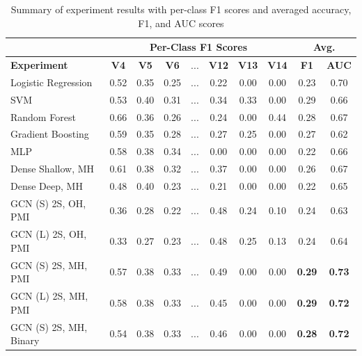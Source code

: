 \documentclass{article}
\begin{document}
\begin{table}[h!]
\centering
\caption{Summary of experiment results with per-class F1 scores and averaged accuracy, F1, and AUC scores}
\label{tab:my-table}
\begin{tabular}{@{}lccclccccc@{}}
\toprule
                            & \multicolumn{7}{c}{\textbf{Per-Class F1 Scores}} & \multicolumn{2}{c}{\textbf{Avg.}} \\ \midrule
\textbf{Experiment} & \textbf{V4} & \textbf{V5} & \textbf{V6} & ... & \textbf{V12} & \textbf{V13} & \textbf{V14} & \textbf{F1} & \textbf{AUC} \\
Logistic Regression         & 0.52  & 0.35  & 0.25  & ... & 0.22 & 0.00 & 0.00 & 0.23            & 0.70            \\
SVM                         & 0.53  & 0.40  & 0.31  & ... & 0.34 & 0.33 & 0.00 & 0.29            & 0.66            \\
Random Forest               & 0.66  & 0.36  & 0.26  & ... & 0.24 & 0.00 & 0.44 & 0.28            & 0.67            \\
Gradient Boosting           & 0.59  & 0.35  & 0.28  & ... & 0.27 & 0.25 & 0.00 & 0.27            & 0.62            \\
MLP                         & 0.58  & 0.38  & 0.34  & ... & 0.00 & 0.00 & 0.00 & 0.22            & 0.66            \\
Dense Shallow, MH           & 0.61  & 0.38  & 0.32  & ... & 0.37 & 0.00 & 0.00 & 0.26            & 0.67            \\
Dense Deep, MH              & 0.48  & 0.40  & 0.23  & ... & 0.21 & 0.00 & 0.00 & 0.22            & 0.65            \\
GCN (S) 2S, OH, PMI         & 0.36  & 0.28  & 0.22  & ... & 0.48 & 0.24 & 0.10 & 0.24            & 0.63            \\
GCN (L) 2S, OH, PMI         & 0.33  & 0.27  & 0.23  & ... & 0.48 & 0.25 & 0.13 & 0.24            & 0.64            \\
GCN (S) 2S, MH, PMI         & 0.57  & 0.38  & 0.33  & ... & 0.49 & 0.00 & 0.00 & \textbf{0.29}            & \textbf{0.73}            \\
GCN (L) 2S, MH, PMI         & 0.58  & 0.38  & 0.33  & ... & 0.45 & 0.00 & 0.00 & \textbf{0.29}           & \textbf{0.72}            \\
GCN (S) 2S, MH, Binary      & 0.54  & 0.38  & 0.33  & ... & 0.46 & 0.00 & 0.00 & \textbf{0.28}            & \textbf{0.72}            \\

\end{tabular}
\end{table}
\end{document}
